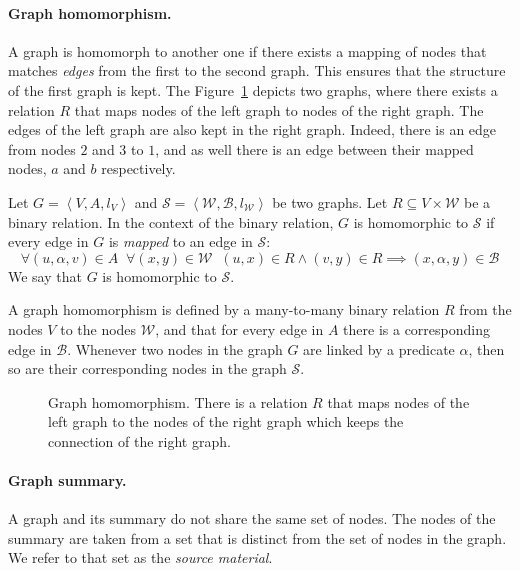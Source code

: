 \paragraph{Graph homomorphism.}

A graph is homomorph to another one if there exists a mapping of nodes that matches \emph{edges} from the first to the second graph. This ensures that the structure of the first graph is kept.
The Figure~\ref{fig:homomorphism} depicts two graphs, where there exists a relation $R$ that maps nodes of the left graph to nodes of the right graph. The edges of the left graph are also kept in the right graph. Indeed, there is an edge from nodes $2$ and $3$ to $1$, and as well there is an edge between their mapped nodes, $a$ and $b$ respectively.

\begin{definition}
	Let $G=\left\langle V, A, l_V \right\rangle$ and $\mathcal{S}=\left\langle \mathcal{W}, \mathcal{B}, l_\mathcal{W} \right\rangle$ be two graphs. Let $R \subseteq V \times \mathcal{W}$ be a binary relation.
	In the context of the binary relation, $G$ is homomorphic to $\mathcal{S}$ if every edge in $G$ is \emph{mapped} to an edge in $\mathcal{S}$:
	$$
	\forall (u, \alpha, v) \in A\;\; \forall (x, y) \in \mathcal{W}\;\; (u, x) \in R \wedge (v, y) \in R \implies (x, \alpha, y) \in \mathcal{B}
	$$
	We say that $G$ is homomorphic to $\mathcal{S}$.
\end{definition}

A graph homomorphism is defined by a many-to-many binary relation $R$ from the nodes $V$ to the nodes $\mathcal{W}$, and that for every edge in $A$ there is a corresponding edge in $\mathcal{B}$. Whenever two nodes in the graph $G$ are linked by a predicate $\alpha$, then so are their corresponding nodes in the graph $\mathcal{S}$.\\

\begin{figure}
	\centering
	
	\caption{Graph homomorphism. There is a relation $R$ that maps nodes of the left graph to the nodes of the right graph which keeps the connection of the right graph.}
	\label{fig:homomorphism}
\end{figure}

\paragraph{Graph summary.}

A graph and its summary do not share the same set of nodes. The nodes of the summary are taken from a set that is distinct from the set of nodes in the graph. We refer to that set as the \emph{source material}.

